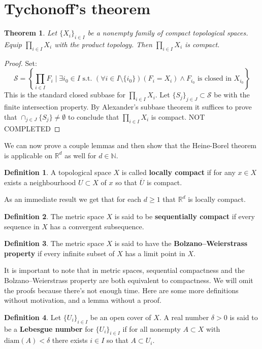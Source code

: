 \documentclass[11pt,a4paper]{article}
\theoremstyle{definition}
\newtheorem{definition}{Definition}[section]
\theoremstyle{plain}
\newtheorem{theorem}{Theorem}[section]
\newcommand{\N}{\mathbb{N}}
\newcommand{\st}{\text{ s.t. }}
\newcommand{\R}{\mathbb{R}}
\begin{document}
	\newpage
	
	\section{Tychonoff’s theorem}
	\begin{theorem}
		Let $\{X_i\}_{i \in I}$ be a nonempty family of compact topological 
		spaces. Equip $\prod_{i \in I}{X_i}$ with the product topology. Then 
		$\prod_{i \in I}{X_i}$ is compact.
	\end{theorem}
	\begin{proof}
		Set:
		\[
			\mathcal{S} = 
			\left\{\prod_{i \in I}{F_i} \mid \exists i_0 \in I \st
			(\forall i \in I \setminus \{i_0\})(F_i = X_i) \land
			F_{i_0} \text{ is closed in } X_{i_0}
			\right\}
		\]
		This is the standard closed subbase for $\prod_{i \in I}{X_i}$.
		Let $\{S_j\}_{j \in J} \subset \mathcal{S}$ be with the finite
		intersection property. By Alexander's subbase theorem it suffices
		to prove that $\cap_{j \in J}\{S_j\} \neq \emptyset$ to conclude
		that $\prod_{i \in I}{X_i}$ is compact.
		NOT COMPLETED
	\end{proof}
	We can now prove a couple lemmas and then show that the Heine-Borel
	theorem is applicable on $\R^d$ as well for $d \in \N$.
	\begin{definition}
		A topological space $X$ is called \textbf{locally compact} if for
		any $x \in X$ exists a neighbourhood $U \subset X$ of $x$ so that
		$\overline{U}$ is compact.
	\end{definition}
	As an immediate result we get that for each $d \geq 1$ that $\R^d$
	is locally compact.
	\begin{definition}
		The metric space $X$ is said to be \textbf{sequentially compact} 
		if every sequence in $X$ has a convergent subsequence.
	\end{definition}
	\begin{definition}
		The metric space $X$ is said to have the 
		\textbf{Bolzano–Weierstrass property} if every infinite subset of 
		$X$ has a limit point in $X$.
	\end{definition}
	It is important to note that in metric spaces, sequential compactness and 
	the Bolzano–Weierstrass property are both
	equivalent to compactness. We will omit the proofs because there's not
	enough time. Here are some more definitions without
	motivation, and a lemma without a proof.
	\begin{definition}
		Let $\{U_i\}_{i \in I}$ be an open cover of $X$. A real number 
		$\delta > 0$ is said to be a \textbf{Lebesgue number} 
		for $\{U_i\}_{i \in I}$
		if for all nonempty $A \subset X$ with $\text{diam}(A) < \delta$
		there exists $i \in I$ so that $A \subset U_i$.
	\end{definition}
\end{document}

